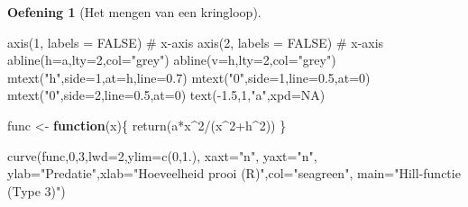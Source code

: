 \documentclass[
  a4paper,
]{scrbook}
\newenvironment{Shaded}{\begin{snugshade}}{\end{snugshade}}
\newcommand{\AttributeTok}[1]{\textcolor[rgb]{0.40,0.45,0.13}{#1}}
\newcommand{\CommentTok}[1]{\textcolor[rgb]{0.37,0.37,0.37}{#1}}
\newcommand{\ConstantTok}[1]{\textcolor[rgb]{0.56,0.35,0.01}{#1}}
\newcommand{\ControlFlowTok}[1]{\textcolor[rgb]{0.00,0.23,0.31}{\textbf{#1}}}
\newcommand{\DecValTok}[1]{\textcolor[rgb]{0.68,0.00,0.00}{#1}}
\newcommand{\FloatTok}[1]{\textcolor[rgb]{0.68,0.00,0.00}{#1}}
\newcommand{\FunctionTok}[1]{\textcolor[rgb]{0.28,0.35,0.67}{#1}}
\newcommand{\NormalTok}[1]{\textcolor[rgb]{0.00,0.23,0.31}{#1}}
\newcommand{\OtherTok}[1]{\textcolor[rgb]{0.00,0.23,0.31}{#1}}
\newcommand{\SpecialCharTok}[1]{\textcolor[rgb]{0.37,0.37,0.37}{#1}}
\newcommand{\StringTok}[1]{\textcolor[rgb]{0.13,0.47,0.30}{#1}}
\theoremstyle{definition}
\newtheorem{exercise}{Oefening}[chapter]
\theoremstyle{remark}
\begin{document}
\begin{exercise}[Het mengen van een
kringloop]
\begin{Shaded}
\begin{Highlighting}[]
\FunctionTok{axis}\NormalTok{(}\DecValTok{1}\NormalTok{, }\AttributeTok{labels =} \ConstantTok{FALSE}\NormalTok{) }\CommentTok{\# x{-}axis}
\FunctionTok{axis}\NormalTok{(}\DecValTok{2}\NormalTok{, }\AttributeTok{labels =} \ConstantTok{FALSE}\NormalTok{) }\CommentTok{\# x{-}axis}
\FunctionTok{abline}\NormalTok{(}\AttributeTok{h=}\NormalTok{a,}\AttributeTok{lty=}\DecValTok{2}\NormalTok{,}\AttributeTok{col=}\StringTok{"grey"}\NormalTok{)}
\FunctionTok{abline}\NormalTok{(}\AttributeTok{v=}\NormalTok{h,}\AttributeTok{lty=}\DecValTok{2}\NormalTok{,}\AttributeTok{col=}\StringTok{"grey"}\NormalTok{)}
\FunctionTok{mtext}\NormalTok{(}\StringTok{"h"}\NormalTok{,}\AttributeTok{side=}\DecValTok{1}\NormalTok{,}\AttributeTok{at=}\NormalTok{h,}\AttributeTok{line=}\FloatTok{0.7}\NormalTok{)}
\FunctionTok{mtext}\NormalTok{(}\StringTok{"0"}\NormalTok{,}\AttributeTok{side=}\DecValTok{1}\NormalTok{,}\AttributeTok{line=}\FloatTok{0.5}\NormalTok{,}\AttributeTok{at=}\DecValTok{0}\NormalTok{)}
\FunctionTok{mtext}\NormalTok{(}\StringTok{"0"}\NormalTok{,}\AttributeTok{side=}\DecValTok{2}\NormalTok{,}\AttributeTok{line=}\FloatTok{0.5}\NormalTok{,}\AttributeTok{at=}\DecValTok{0}\NormalTok{)}
\FunctionTok{text}\NormalTok{(}\SpecialCharTok{{-}}\FloatTok{1.5}\NormalTok{,}\DecValTok{1}\NormalTok{,}\StringTok{"a"}\NormalTok{,}\AttributeTok{xpd=}\ConstantTok{NA}\NormalTok{)}

\NormalTok{func }\OtherTok{\textless{}{-}} \ControlFlowTok{function}\NormalTok{(x)\{}
  \FunctionTok{return}\NormalTok{(a}\SpecialCharTok{*}\NormalTok{x}\SpecialCharTok{\^{}}\DecValTok{2}\SpecialCharTok{/}\NormalTok{(x}\SpecialCharTok{\^{}}\DecValTok{2}\SpecialCharTok{+}\NormalTok{h}\SpecialCharTok{\^{}}\DecValTok{2}\NormalTok{))}
\NormalTok{\}}

\FunctionTok{curve}\NormalTok{(func,}\DecValTok{0}\NormalTok{,}\DecValTok{3}\NormalTok{,}\AttributeTok{lwd=}\DecValTok{2}\NormalTok{,}\AttributeTok{ylim=}\FunctionTok{c}\NormalTok{(}\DecValTok{0}\NormalTok{,}\FloatTok{1.}\NormalTok{), }\AttributeTok{xaxt=}\StringTok{"n"}\NormalTok{, }\AttributeTok{yaxt=}\StringTok{"n"}\NormalTok{,}
      \AttributeTok{ylab=}\StringTok{"Predatie"}\NormalTok{,}\AttributeTok{xlab=}\StringTok{"Hoeveelheid prooi (R)"}\NormalTok{,}\AttributeTok{col=}\StringTok{"seagreen"}\NormalTok{,}
      \AttributeTok{main=}\StringTok{"Hill{-}functie (Type 3)"}\NormalTok{)}


\end{Highlighting}
\end{Shaded}
\end{exercise}
\end{document}
